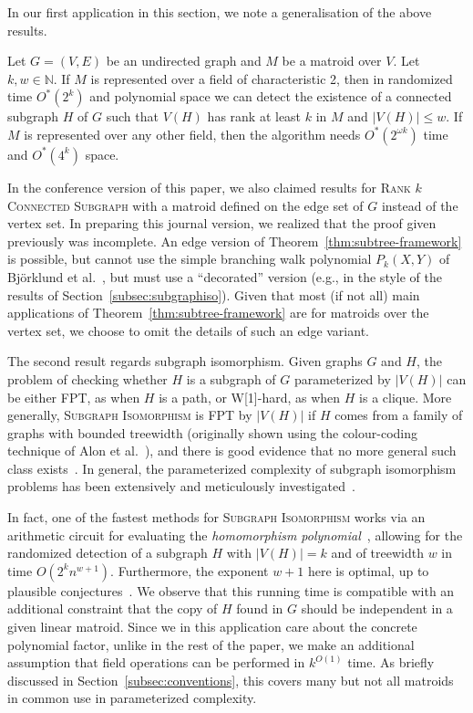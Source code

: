 \documentclass{theoretics}
\newcommand{\N}{\ensuremath{\mathbb N}\xspace}
\begin{document}
In our first application in this section, we note a 
generalisation of the above results.

\begin{theorem}
  \label{thm:subtree-framework}
  Let $G=(V,E)$ be an undirected graph and $M$ be a matroid over $V$. 
  Let $k, w \in \N$. If $M$ is represented over a field of characteristic 2,
  then in randomized time $O^*(2^k)$ and polynomial space we can
  detect the existence of a connected subgraph $H$ of $G$ such that
  $V(H)$
  has rank at least $k$ in $M$ and
  $|V(H)| \leq w$.
  If $M$ is represented over any other field, then the algorithm needs
  $O^*(2^{\omega k})$ time and $O^*(4^k)$ space. 
\end{theorem}

\begin{remark}
  In the conference version of this paper, we also claimed results
  for \textsc{Rank $k$ Connected Subgraph} with a matroid defined on
  the edge set of $G$ instead of the vertex set. In preparing 
  this journal version, we realized that the proof given previously
  was incomplete. An edge version of Theorem~\ref{thm:subtree-framework} is possible,
  but cannot use the simple branching walk polynomial $P_k(X,Y)$
  of Björklund et al.~\cite{BjorklundKK16}, but must use a ``decorated'' version
  (e.g., in the style of the results of Section~\ref{subsec:subgraphiso}). 
  Given that most (if not all) main applications of Theorem~\ref{thm:subtree-framework}
  are for matroids over the vertex set, we choose to omit the details
  of such an edge variant.
\end{remark}

The second result regards subgraph isomorphism. Given graphs $G$ and $H$,
the problem of checking whether $H$ is a subgraph of $G$ parameterized
by $|V(H)|$ can be either FPT, as when $H$ is a path,
or W[1]-hard, as when $H$ is a clique. More generally,
\textsc{Subgraph Isomorphism} is FPT by $|V(H)|$ if $H$ comes from a
family of graphs with bounded treewidth (originally shown using the
colour-coding technique of Alon et al.~\cite{AlonYZ95}),
and there is good evidence that no more general such class
exists~\cite{BringmannS21,Marx10twd}.
In general, the parameterized complexity of subgraph isomorphism
problems has been extensively and meticulously investigated~\cite{JansenM15,MarxP14everything}.

In fact, one of the fastest methods for \textsc{Subgraph Isomorphism}
works via an arithmetic circuit for evaluating the \emph{homomorphism polynomial}~\cite{FominLRSR12},
allowing for the randomized detection of a subgraph $H$ with
$|V(H)|=k$ and of treewidth $w$ in time $O(2^kn^{w+1})$. 
Furthermore, the exponent $w+1$ here is optimal, up to plausible conjectures~\cite{BringmannS21}.
We observe that this running time is compatible with an additional constraint that 
the copy of $H$ found in $G$ should be independent in a given linear matroid.
Since we in this application care about the concrete polynomial factor,
unlike in the rest of the paper, we make an additional assumption that 
field operations can be performed in $k^{O(1)}$ time. As briefly discussed
in Section~\ref{subsec:conventions}, this covers many but not all matroids in common use
in parameterized complexity. 
\end{document}
